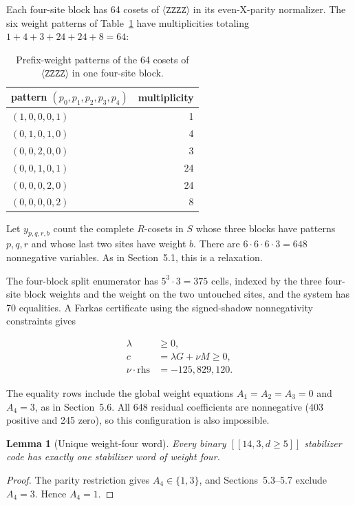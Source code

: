 \documentclass[11pt]{article}
\newtheorem{lemma}[theorem]{Lemma}
\newcommand{\rhs}{\mathrm{rhs}}
\begin{document}
Each four-site block has 64 cosets of \(\langle \mathtt{ZZZZ} \rangle\) in its even-X-parity normalizer. The six weight patterns of Table~\ref{tab:block-patterns} have multiplicities totaling \(1+4+3+24+24+8=64\):

{
\begin{longtable}[]{@{}lr@{}}
\caption{Prefix-weight patterns of the 64 cosets of \(\langle \mathtt{ZZZZ} \rangle\) in one four-site block.}
\label{tab:block-patterns}\\
\toprule\noalign{}
pattern \((p_{0},p_{1},p_{2},p_{3},p_{4})\) & multiplicity \\
\midrule\noalign{}
\endhead
\bottomrule\noalign{}
\endlastfoot
\((1,0,0,0,1)\) & 1 \\
\((0,1,0,1,0)\) & 4 \\
\((0,0,2,0,0)\) & 3 \\
\((0,0,1,0,1)\) & 24 \\
\((0,0,0,2,0)\) & 24 \\
\((0,0,0,0,2)\) & 8 \\
\end{longtable}
}

Let \(y_{p,q,r,b}\) count the complete \(R\)-cosets in \(S\) whose three blocks have patterns \(p,q,r\) and whose last two sites have weight \(b\). There are \(6\cdot6\cdot6\cdot3=648\) nonnegative variables. As in Section~5.1, this is a relaxation.

The four-block split enumerator has \(5^3\cdot3=375\) cells, indexed by the three four-site block weights and the weight on the two untouched sites, and the system has 70 equalities. A Farkas certificate using the signed-shadow nonnegativity constraints gives

\[
\begin{aligned}
\lambda &\geq 0, \\
c &=\lambda G + \nu M \geq 0, \\
\nu \cdot \rhs &=-125{,}829{,}120.
\end{aligned}
\]

The equality rows include the global weight equations \(A_{1}=A_{2}=A_{3}=0\) and \(A_{4}=3\), as in Section~5.6. All 648 residual coefficients are nonnegative (403 positive and 245 zero), so this configuration is also impossible.

\begin{lemma}[Unique weight-four word]\label{lem:unique-check}
Every binary \(\left[\!\left[14,3,d\geq5\right]\!\right]\) stabilizer code has exactly one stabilizer word of weight four.
\end{lemma}
\begin{proof}
The parity restriction gives \(A_4\in\{1,3\}\), and Sections~5.3--5.7 exclude \(A_4=3\). Hence \(A_4=1\).
\end{proof}
\end{document}
